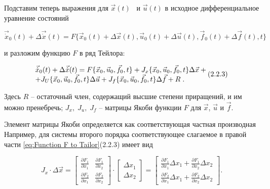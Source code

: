 		Подставим теперь выражения для  $\vec x(t)$ \ и  $\vec u(t)$ в исходное дифференциальное уравнение состояний


\begin{equation*}
\vec{\dot x}_0(t)+\Delta \vec{\dot x}(t)=F\{\vec x_0(t)+\Delta \vec x(t),\vec u_0(t)+\Delta \vec u(t),\vec f_0(t)+\Delta \vec f(t),t\}
\end{equation*}

		и разложим функцию  $F$ в ряд Тейлора:



\begin{equation}\label{eq:Function F to Tailor}
		\begin{matrix}\vec{\dot x}_0(t)+\Delta \vec{\dot x}(t)=F\{\vec x_0,\vec u_0,\vec f_0,t\}+J_x\{\vec
		x_0,\vec u_0,\vec f_0,t\}\Delta \vec x+\hfill\null \\+J_U\{\vec x_0,\vec u_0,\vec f_0,t\}\Delta \vec u+J_f\{\vec x_0,\vec u_0,\vec
		f_0,t\}\Delta \vec f+R\;.\hfill\null \end{matrix}\hfill   (2.2.3)
\end{equation}



		Здесь  $R$ – остаточный член, содержащий высшие степени приращений, и им можно пренебречь;  $J_x,\;J_u,\;J_f$ – матрицы
		Якоби функции  $F$ для  $\vec x$,  $\vec u$ и  $\vec f$.

		Элемент матрицы Якоби определяется как со­от­вет­ствующая частная производная 
		Например, для системы второго порядка соответствующее слагаемое в правой части \eqref{eq:Function F to Tailor}(2.2.3) имеет вид



\bigskip

\begin{equation*}\label{key}
	J_x\cdot \Delta \vec x=\left[\begin{matrix}\frac{\partial F_1}{\partial x_1}&\frac{\partial F_1}{\partial
			x_2}\\\frac{\partial F_2}{\partial x_1}&\frac{\partial F_2}{\partial x_2}\end{matrix}\right]\cdot
		\left[\begin{matrix}\mathit{\Delta x}_1\\\mathit{\Delta x}_2\end{matrix}\right]=\left[\begin{matrix}\frac{\partial F_1}{\partial
			x_1}\mathit{\Delta x}_1+\frac{\partial F_1}{\partial x_2}\mathit{\Delta x}_2\\\frac{\partial F_2}{\partial
			x_1}\mathit{\Delta x}_1+\frac{\partial F_2}{\partial x_2}\mathit{\Delta x}_2\end{matrix}\right].
\end{equation*}



